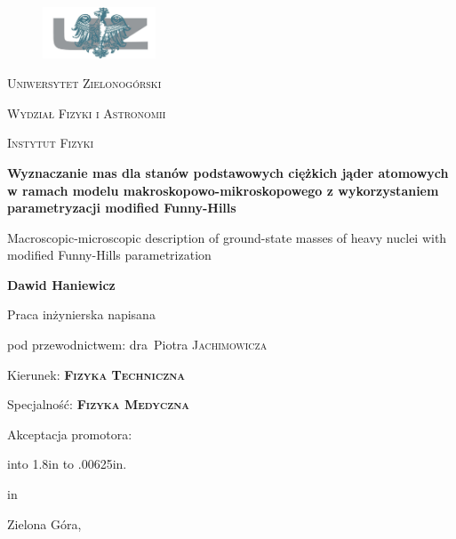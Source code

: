 \documentclass[a4paper,polish,twoside]{article}
\def\signature#1#2#3{{\hskip#1in{\hbox to #2in%
{\leaders\hbox to .00625in{\hfil.\hfil}\hfill}}%
 \par\hskip#1in#3\vskip1cm}}
\numberwithin{equation}{section}
\begin{document}
\begin{titlepage}
	\renewcommand{\baselinestretch}{1} 
	\centering
	\begin{figure}[t]
	\centering
	\includegraphics[width=0.3\textwidth]{logo_uz}
	\end{figure}
	\vspace{1cm}
	{\scshape\huge Uniwersytet Zielonogórski \par}
	{\scshape\LARGE Wydział Fizyki i Astronomii \par}
	{\scshape\Large Instytut Fizyki \par}
	\vspace{1.5cm}
	{\Large\bfseries Wyznaczanie mas dla stanów podstawowych ciężkich jąder atomowych w ramach modelu makroskopowo-mikroskopowego z wykorzystaniem parametryzacji modif{}ied Funny-Hills \par}
	\vspace{1cm}
	{\Large Macroscopic-microscopic description of ground-state masses of heavy nuclei with modified Funny-Hills parametrization \par}
	\vspace{1.5cm}
	{\Large\textbf{Dawid Haniewicz} \par}
	\vspace{2cm}
	Praca inżynierska napisana \par
	pod przewodnictwem: dra~Piotra \textsc{Jachimowicza} \par
	\vspace{1.5cm}
	{Kierunek: \textsc{\textbf{Fizyka Techniczna}} \par}
	{Specjalność: \textsc{\textbf{Fizyka Medyczna}} \par}
	\vspace{1.5cm}
	Akceptacja promotora: \par
	\vspace{0.5cm}
	\signature{0}{1.8}
	\vfill
	{\large Zielona Góra, \the\year \par}
	\thispagestyle{empty}
\end{titlepage}

\setcounter{page}{2}

\clearpage

\tableofcontents
\clearpage
\end{document}

